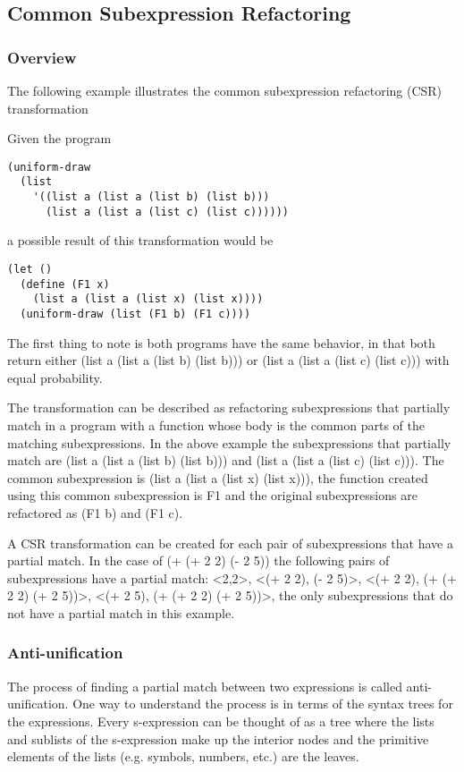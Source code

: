 \documentclass[a4paper,10pt]{article}
\begin{document}
\subsection{Common Subexpression Refactoring}
\subsubsection{Overview}
The following example illustrates the common subexpression refactoring (CSR) transformation

Given the program 
\begin{verbatim}
(uniform-draw 
  (list 
    '((list a (list a (list b) (list b)))
      (list a (list a (list c) (list c))))))
\end{verbatim}
a possible result of this transformation would be
\begin{verbatim}
(let ()
  (define (F1 x)
    (list a (list a (list x) (list x))))
  (uniform-draw (list (F1 b) (F1 c))))
\end{verbatim}

The first thing to note is both programs have the same behavior, in that both return either (list a (list a (list b) (list b))) or (list a (list a (list c) (list c))) with equal probability.

  The transformation can be described as refactoring subexpressions that partially match in a program with a function whose body is the common parts of the matching subexpressions.  In the above example the subexpressions that partially match are (list a (list a (list b) (list b))) and (list a (list a (list c) (list c))).  The common subexpression is (list a (list a (list x) (list x))), the function created using this common subexpression is F1 and the original subexpressions are refactored as (F1 b) and (F1 c).

A CSR transformation can be created for each pair of subexpressions that have a partial match.  In the case of (+ (+ 2 2) (- 2 5)) the following pairs of subexpressions have a partial match: <2,2>, <(+ 2 2), (- 2 5)>, <(+ 2 2), (+ (+ 2 2) (+ 2 5))>, <(+ 2 5), (+ (+ 2 2) (+ 2 5))>, the only subexpressions that do not have a partial match in this example.
\subsubsection{Anti-unification}
The process of finding a partial match between two expressions is called anti-unification.  One way to understand the process is in terms of the syntax trees for the expressions.  Every s-expression can be thought of as a tree where the lists and sublists of the s-expression make up the interior nodes and the primitive elements of the lists (e.g. symbols, numbers, etc.) are the leaves.
\end{document}

